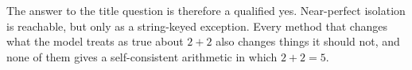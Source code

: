 The answer to the title question is therefore a qualified yes. Near-perfect isolation is reachable, but only as a string-keyed exception. Every method that changes what the model treats as true about $2+2$ also changes things it should not, and none of them gives a self-consistent arithmetic in which $2+2=5$.
